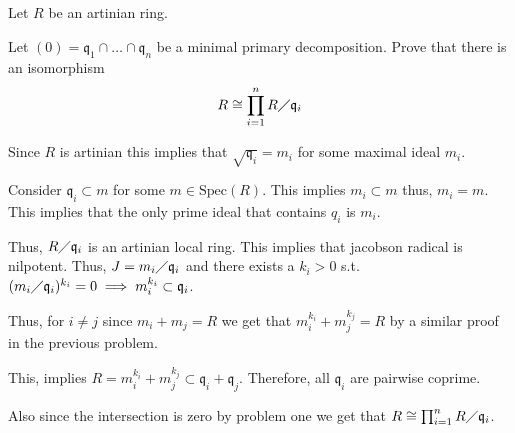 \documentclass[12pt, letterpaper]{article}
\newcommand{\Spec}{\mathrm{Spec}}
\newcommand{\mf}[1]{\mathfrak{#1}}
\begin{document}
\begin{problem}{}
    Let $R$ be an artinian ring.
\end{problem}
\begin{subproblem}{}
    Let $(0)=\mf{q}_1 \cap \dots \cap \mf{q}_n$ be a minimal primary decomposition. Prove that there is an isomorphism
    \[R \cong \prod_{i=1}^n R \diagup \mf{q}_i\]
\end{subproblem}
\begin{problemproof}
    Since $R$ is artinian this implies that $\sqrt{\mf{q}_i}=m_i$ for some maximal ideal $m_i$.

    Consider $\mf{q}_i \subset m$ for some $m \in \Spec(R)$. This implies $m_i \subset m$ thus, $m_i = m$. This implies that the only prime ideal that contains $q_i$ is $m_i$.

    Thus, $R \diagup \mf{q}_i$ is an artinian local ring. This implies that jacobson radical is nilpotent. Thus, $J=m_i \diagup \mf{q}_i$ and there exists a $k_i > 0$ s.t. $(m_i \diagup \mf{q}_i)^{k_i} = 0 \implies m_i^{k_i} \subset \mf{q}_i$.

    Thus, for $i \neq j$ since $m_i + m_j = R$ we get that $m_i^{k_i} + m_j^{k_j} = R$ by a similar proof in the previous problem.

    This, implies $R= m_i^{k_i} + m_j^{k_j} \subset \mf{q}_i + \mf{q}_j$.
    Therefore, all $\mf{q}_i$ are pairwise coprime.

    Also since the intersection is zero by problem one we get that $R \cong \prod_{i=1}^n R \diagup \mf{q}_i$.
\end{problemproof}
\end{document}
